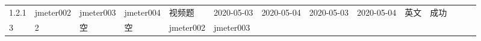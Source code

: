 \documentclass[hyperref, a4paper]{ctexart}
\begin{document}
\begin{longtable}[]{@{}llllllllllllll@{}}
\begin{minipage}[t]{0.06\columnwidth}
1.2.1\strut
\end{minipage} & \begin{minipage}[t]{0.04\columnwidth}\raggedright
jmeter002\strut
\end{minipage} & \begin{minipage}[t]{0.04\columnwidth}\raggedright
jmeter003\strut
\end{minipage} & \begin{minipage}[t]{0.04\columnwidth}\raggedright
jmeter004\strut
\end{minipage} & \begin{minipage}[t]{0.02\columnwidth}\raggedright
视频题\strut
\end{minipage} & \begin{minipage}[t]{0.04\columnwidth}\raggedright
2020-05-03\strut
\end{minipage} & \begin{minipage}[t]{0.05\columnwidth}\raggedright
2020-05-04\strut
\end{minipage} & \begin{minipage}[t]{0.07\columnwidth}\raggedright
2020-05-03\strut
\end{minipage} & \begin{minipage}[t]{0.08\columnwidth}\raggedright
2020-05-04\strut
\end{minipage} & \begin{minipage}[t]{0.04\columnwidth}\raggedright
英文\strut
\end{minipage} & \begin{minipage}[t]{0.02\columnwidth}\raggedright
成功\strut
\end{minipage}\tabularnewline
\begin{minipage}[t]{0.01\columnwidth}\raggedright
3\strut
\end{minipage} & \begin{minipage}[t]{0.12\columnwidth}\raggedright
2\strut
\end{minipage} & \begin{minipage}[t]{0.03\columnwidth}\raggedright
空\strut
\end{minipage} & \begin{minipage}[t]{0.06\columnwidth}\raggedright
空\strut
\end{minipage} & \begin{minipage}[t]{0.04\columnwidth}\raggedright
jmeter002\strut
\end{minipage} & \begin{minipage}[t]{0.04\columnwidth}\raggedright
jmeter003\strut
\end{minipage} & \begin{minipage}[t]{0.04\columnwidth}\raggedright

\end{minipage}
\end{longtable}
\end{document}
